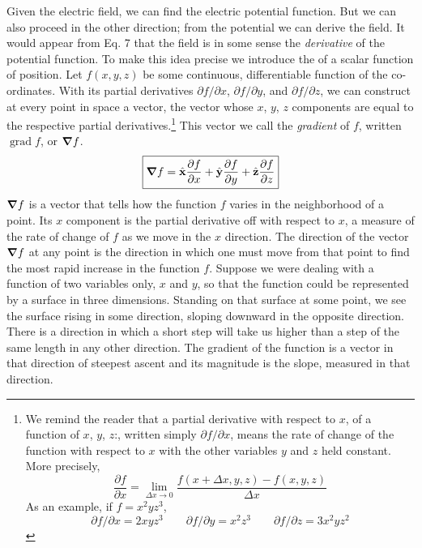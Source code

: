 Given the electric field, we can find the electric potential function.
But we can also proceed in the other direction; from the potential we
can derive the field. It would appear from Eq. 7 that the field is in
some sense the \emph{derivative} of the potential function. To make this idea
precise we introduce the  of a scalar function of position.
Let $f(x,y,z)$ be some continuous, differentiable function of the co-
ordinates. With its partial derivatives $\partial f/\partial x$, 
$\partial f/\partial y$, and $\partial f/\partial z$,  we
can construct at every point in space a vector, the vector whose $x$, $y$, $z$
components are equal to the respective partial derivatives.\footnote{We
remind the reader that a partial derivative with respect to $x$, of a function of
$x$, $y$, $z$:, written simply $\partial f/\partial x$,
means the rate of change of the function with respect to $x$
with the other variables $y$ and $z$ held constant. More precisely,
\begin{equation*}
  \frac{\partial f}{\partial x} = \lim_{\Delta x\rightarrow0} \frac{f(x+\Delta x,y,z)-f(x,y,z)}{\Delta x}
\end{equation*}
As an example, if $f = x^2yz^3$,
\begin{equation*}
  \partial f/\partial x=2xyz^3 \qquad \partial f/\partial y=x^2z^3 \qquad \partial f/\partial z = 3x^2yz^2
\end{equation*}
} This
vector we call the \emph{gradient} of $f$, written $\operatorname{grad} f$, or $\boldsymbol{\nabla} f$.
\begin{equation}
\boxed{
  \boldsymbol{\nabla} f = \hat{\mathbf{x}} \frac{\partial f}{\partial x} + \hat{\mathbf{y}} \frac{\partial f}{\partial y}
          + \hat{\mathbf{z}} \frac{\partial f}{\partial z}
}
\end{equation}
\noindent $\boldsymbol{\nabla} f$ is a vector that tells how the function $f$ varies in the neighborhood
of a point. Its $x$ component is the partial derivative off with respect
to $x$, a measure of the rate of change of $f$ as we move in the $x$ direction.
The direction of the vector $\boldsymbol{\nabla} f$ at any point is the direction in which
one must move from that point to find the most rapid increase in the
function $f$. Suppose we were dealing with a function of two variables
only, $x$ and $y$, so that the function could be represented by a surface
in three dimensions. Standing on that surface at some point, we see
the surface rising in some direction, sloping downward in the opposite
direction. There is a direction in which a short step will take us
higher than a step of the same length in any other direction. The
gradient of the function is a vector in that direction of steepest ascent
and its magnitude is the slope, measured in that direction.

